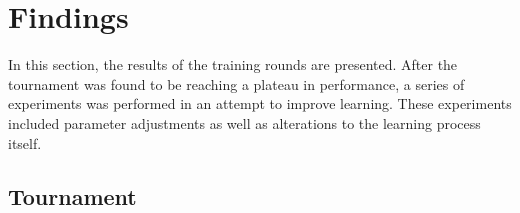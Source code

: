 \section{Findings}
\label{sec:findings}

In this section,
the results of the training rounds are presented.
%
After the tournament was found to be reaching a plateau in performance,
a series of experiments was performed in an attempt to improve learning.
%
These experiments included parameter adjustments as well as alterations to the
learning process itself.


\subsection{Tournament}






%

